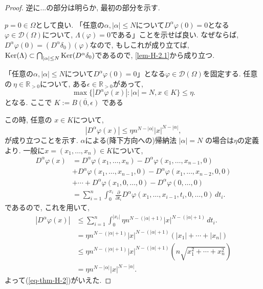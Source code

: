 \begin{proof}
逆に...の部分は明らか, 最初の部分を示す.  

\(p=0 \in \Omega\)として良い. 
「任意の\(\alpha, |\alpha|\le N\)について\(D^\alpha \varphi(0)=0\)となる$\varphi \in \mathcal{D}(\Omega)$について, 
\(\Lambda(\varphi)=0\)である」ことを示せば良い.
なぜならば, $D^\alpha \varphi(0)=(D^\alpha \delta_0)(\varphi)$なので, もしこれが成り立てば, \(\mathrm{Ker}(\Lambda) \subset \bigcap_{|\alpha|\le N} \mathrm{Ker}(D^\alpha \delta_0)\)であるので, \ref{lem-H-2.1}から成り立つ. 


「任意の\(\alpha, |\alpha|\le N\)について\(D^\alpha \varphi(0)=0\)」となる$\varphi \in \mathcal{D}(\Omega)$を固定する. 
任意の\(\ \eta \in \mathbb{R}_{>0}\)について, ある\( \epsilon \in \mathbb{R}_{>0}\)があって, 
\[
\max \{ |D^\alpha \varphi(x)| : |\alpha|=N, x \in K \} \le \eta.
\]
となる. ここで  \(K:=\overline{B(0,\epsilon)}\) である

この時, 任意の \( x \in K\)について, 
\begin{equation}
\label{eq-thm-H-2}
|D^\alpha \varphi(x)| \le \eta n^{N-|\alpha|} |x|^{N-|\alpha|},
\end{equation}
が成り立つことを示す. 
$\alpha$による(降下方向への)帰納法
 \(|\alpha|=N\) の場合は\(\eta\)の定義より.  
一般に\(x = (x_1,\dots,x_n) \in K\)について, 
\begin{align*}
D^\alpha \varphi(x) 
&= D^\alpha \varphi(x_1,\dots,x_n) - D^\alpha \varphi(x_1,\dots,x_{n-1},0) \\
&+ D^\alpha \varphi(x_1,\dots,x_{n-1},0) - D^\alpha \varphi(x_1,\dots,x_{n-2},0,0) \\
&+ \cdots + D^\alpha \varphi(x_1,0,\dots,0) - D^\alpha \varphi(0,\dots,0) \\
&= \sum_{i=1}^n \int^{x_i}_{0} \frac{\partial}{\partial t_i} D^\alpha \varphi(x_1,\dots,x_{i-1},t_i,0,\dots,0)\,dt_i.
\end{align*}
であるので, これを用いて, 
\begin{align*}
 |D^\alpha \varphi(x)| 
 &\le \sum_{i=1}^n \int^{|x_i|}_{0} \eta n^{N-(|\alpha|+1)} |x|^{N-(|\alpha|+1)} \,dt_i.\\
&= \eta n^{N-(|\alpha|+1)} |x|^{N-(|\alpha|+1)} (|x_1|+\cdots+|x_n|) \\
&\le \eta n^{N-(|\alpha|+1)} |x|^{N-(|\alpha|+1)} (n \sqrt{x_1^2+\cdots+x_n^2})\\
&=\eta n^{N-|\alpha|} |x|^{N-|\alpha|}.
\end{align*}
よって(\ref{eq-thm-H-2})がいえた. 


\end{proof}
